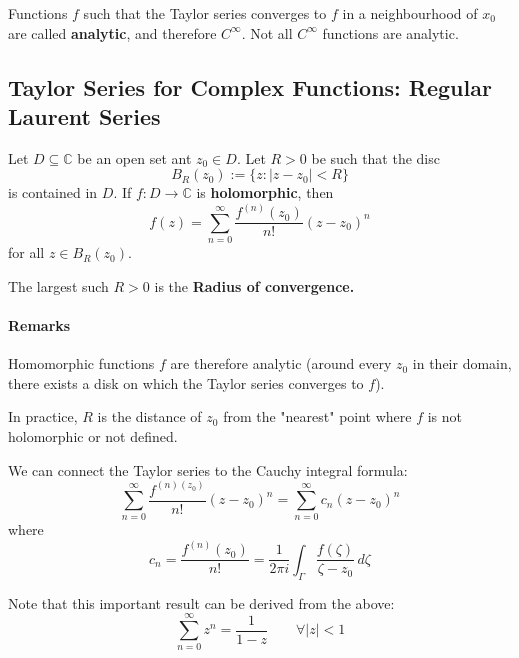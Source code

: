 Functions $f$ such that the Taylor series converges to $f$ in a neighbourhood of $x_0$ are called \textbf{analytic}, and therefore $C^\infty$. Not all $C^\infty$ functions are analytic.
\subsection{Taylor Series for Complex Functions: Regular Laurent Series}
Let $D\subseteq \mathbb C$ be an open set ant $z_0\in D$. Let $R> 0$ be such that the disc
\begin{equation*}
	B_R(z_0):=\{z:|z-z_0|<R\}
\end{equation*}
is contained in $D$. If $f:D\to \mathbb C$ is \textbf{holomorphic}, then \begin{equation*}
	f(z)=\sum_{n=0}^\infty \frac{f^{(n)}(z_0)}{n!}(z-z_0)^n
\end{equation*}
for all $z \in B_R(z_0)$.

The largest such $R > 0 $ is the \textbf{Radius of convergence.}

\paragraph{Remarks} Homomorphic functions $f$ are therefore analytic (around every $z_0$ in their domain, there exists a disk on which the Taylor series converges to $f$).

In practice, $R$ is the distance of $z_0$ from the "nearest" point where $f$ is not holomorphic or not defined.

We can connect the Taylor series to the Cauchy integral formula:
\begin{equation*}
	\sum_{n=0}^\infty \frac{f^{(n)(z_0)}}{n!}(z-z_0)^n = \sum_{n=0}^\infty c_n(z-z_0)^n
\end{equation*}
where
\begin{equation*}
	c_n = \frac{f^{(n)}(z_0)}{n!}= \frac 1{2\pi i} \int_\Gamma \frac{f(\zeta)}{\zeta - z_0}\,d\zeta
\end{equation*}

Note that this important result can be derived from the above:
\begin{equation*}
	\boxed{\sum_{n=0}^\infty z^n=\frac 1{1-z}} \qquad \forall |z|< 1
\end{equation*}


